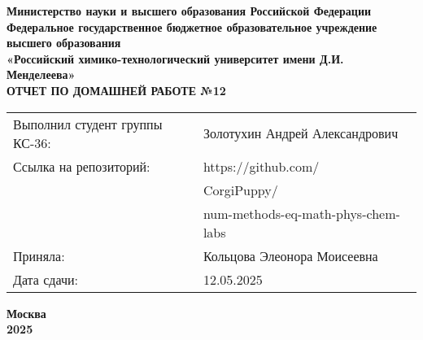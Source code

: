 \documentclass[12pt, a4paper]{report}
\begin{document}
	\begin{titlepage}
		\begin{center}
			\large \textbf{Министерство науки и высшего образования Российской Федерации} \\
			\large \textbf{Федеральное государственное бюджетное образовательное учреждение высшего образования} \\
			\large \textbf{«Российский химико-технологический университет имени Д.И. Менделеева»} \\

			\vspace*{4cm}
			\LARGE \textbf{ОТЧЕТ ПО ДОМАШНЕЙ РАБОТЕ №12}

			\vspace*{4cm}
			\begin{flushright}
				\Large
				\begin{tabular}{>{\raggedleft\arraybackslash}p{9cm} p{10cm}}
					Выполнил студент группы КС-36: & Золотухин Андрей Александрович \\
					Ссылка на репозиторий: & https://github.com/ \\
					& CorgiPuppy/ \\
					& num-methods-eq-math-phys-chem-labs \\
					Приняла: & Кольцова Элеонора Моисеевна \\
					Дата сдачи: & 12.05.2025 \\
				\end{tabular}
			\end{flushright}

			\vspace*{6cm}
			\Large \textbf{Москва \\ 2025}
		\end{center}
	\end{titlepage}

	\tableofcontents
	\thispagestyle{empty}
	\newpage

\end{document}
